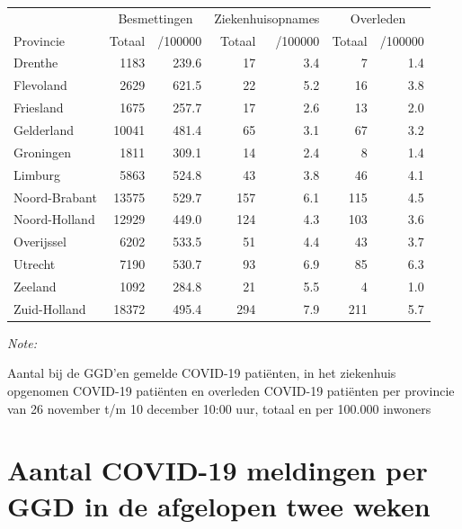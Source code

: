 \documentclass[
  english,
  man,floatsintext]{apa6}
\begin{document}
\begin{table}[H]
\centering
\begin{threeparttable}
\begin{tabular}{lrrrrrr}
\toprule
\multicolumn{1}{c}{ } & \multicolumn{2}{c}{Besmettingen} & \multicolumn{2}{c}{Ziekenhuisopnames} & \multicolumn{2}{c}{Overleden} \\
\cmidrule(l{3pt}r{3pt}){2-3} \cmidrule(l{3pt}r{3pt}){4-5} \cmidrule(l{3pt}r{3pt}){6-7}
Provincie & Totaal & /100000 & Totaal & /100000 & Totaal & /100000\\
\midrule
Drenthe & 1183 & 239.6 & 17 & 3.4 & 7 & 1.4\\
Flevoland & 2629 & 621.5 & 22 & 5.2 & 16 & 3.8\\
Friesland & 1675 & 257.7 & 17 & 2.6 & 13 & 2.0\\
Gelderland & 10041 & 481.4 & 65 & 3.1 & 67 & 3.2\\
Groningen & 1811 & 309.1 & 14 & 2.4 & 8 & 1.4\\
Limburg & 5863 & 524.8 & 43 & 3.8 & 46 & 4.1\\
Noord-Brabant & 13575 & 529.7 & 157 & 6.1 & 115 & 4.5\\
Noord-Holland & 12929 & 449.0 & 124 & 4.3 & 103 & 3.6\\
Overijssel & 6202 & 533.5 & 51 & 4.4 & 43 & 3.7\\
Utrecht & 7190 & 530.7 & 93 & 6.9 & 85 & 6.3\\
Zeeland & 1092 & 284.8 & 21 & 5.5 & 4 & 1.0\\
Zuid-Holland & 18372 & 495.4 & 294 & 7.9 & 211 & 5.7\\
\bottomrule
\end{tabular}
\begin{tablenotes}
\item \textit{Note: } 
\item Aantal bij de GGD’en gemelde COVID-19 patiënten, in het ziekenhuis opgenomen COVID-19 patiënten en overleden COVID-19 patiënten per provincie van 26 november t/m 10 december 10:00 uur, totaal en per 100.000 inwoners
\end{tablenotes}
\end{threeparttable}
\end{table}

\newpage

\hypertarget{aantal-covid-19-meldingen-per-ggd-in-de-afgelopen-twee-weken}{%
\section{Aantal COVID-19 meldingen per GGD in de afgelopen twee weken}\label{aantal-covid-19-meldingen-per-ggd-in-de-afgelopen-twee-weken}}
\end{document}
